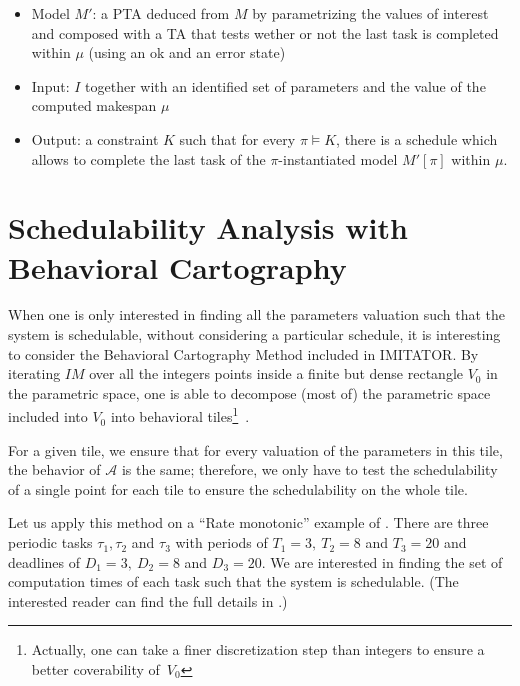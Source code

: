 \documentclass{article}
\begin{document}
\begin{itemize}
 \item Model $M'$: a PTA deduced from $M$ by parametrizing the values of interest and composed with a TA that tests wether or not the last task is completed within $\mu$ (using an ok and an error state)\\
 \item Input: $I$ together with an identified set of parameters and the value of the computed makespan $\mu$ \\
 \item Output: a constraint $K$ such that for every $\pi \models K$, there is a schedule which allows to complete the last task of the $\pi$-instantiated model $M'[\pi]$ within $\mu$.
\end{itemize}

\section{Schedulability Analysis with Behavioral Cartography}
When one is only interested in finding all the parameters valuation such that the system is schedulable, without considering a particular schedule, it is interesting to consider the Behavioral Cartography Method
included in IMITATOR. 
 By iterating $IM$ over all the integers points %
inside a finite but dense rectangle $V_0$ in the parametric space, one is able to decompose (most of) the parametric space included into $V_0$ into behavioral tiles\footnote{Actually, one can take a finer discretization step than integers to ensure a better coverability of~$V_0$}~\cite{af10}.

For a given tile, we ensure that for every valuation of the parameters in this tile, the behavior of $\mathcal{A}$ is the same;
therefore, we only have to test the schedulability of a single point for each tile to ensure the schedulability on the whole tile.

Let us apply this method on a ``Rate monotonic'' example of \cite[Section~III]{bb04}.
There are three periodic tasks $\tau_1, \tau_2$ and $\tau_3$ with periods of $T_1 = 3, \ T_2 = 8$ and $T_3 = 20$ and deadlines of $D_1 = 3, \ D_2 = 8$ and $D_3 = 20$.
We are interested in finding the set of computation times of each task such that the system is schedulable.
(The interested reader can find the full details in \cite{bb04}.)
\end{document}
